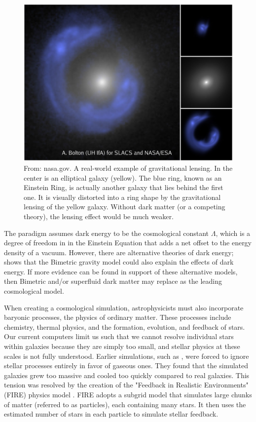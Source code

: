 \begin{figure}
    \centering
    \includegraphics*[width=\textwidth*2/3]{figs/gravity_lensing.jpg}
    
    \caption{From: nasa.gov. A real-world example of gravitational lensing. In the center is an elliptical galaxy (yellow). The blue ring, known as an Einstein Ring, is actually another galaxy that lies behind the first one. It is visually distorted into a ring shape by the gravitational lensing of the yellow galaxy. Without dark matter (or a competing theory), the lensing effect would be much weaker.}
    \label{fig:grav-lensing}
\end{figure}

The \lcdm\* paradigm assumes dark energy to be the cosmological constant $\Lambda$, which is a degree of freedom in in the Einstein Equation that adds a net offset to the energy density of a vacuum. However, there are alternative theories of dark energy; \cite{bassiCosmologicalEvolutionBimetric2023} shows that the Bimetric gravity model could also explain the effects of dark energy. If more evidence can be found in support of these alternative models, then Bimetric and/or superfluid dark matter may replace \lcdm\space as the leading cosmological model.

When creating a cosmological simulation, astrophysicists must also incorporate baryonic processes, the physics of ordinary matter. These processes include chemistry, thermal physics, and the formation, evolution, and feedback of stars. Our current computers limit us such that we cannot resolve individual stars within galaxies \citep{feldmannFIREboxSimulatingGalaxies2022} because they are simply too small, and stellar physics at these scales is not fully understood. Earlier simulations, such as \cite{bournaudISMPropertiesHydrodynamic2010}, were forced to ignore stellar processes entirely in favor of gaseous ones. They found that the simulated galaxies grew too massive and cooled too quickly compared to real galaxies. This tension was resolved by the creation of the "Feedback in Realistic Environments" (FIRE) physics model \citep{hopkinsFIRE2SimulationsPhysics2018}. FIRE adopts a subgrid model that simulates large chunks of matter (referred to as particles), each containing many stars. It then uses the estimated number of stars in each particle to simulate stellar feedback. 

